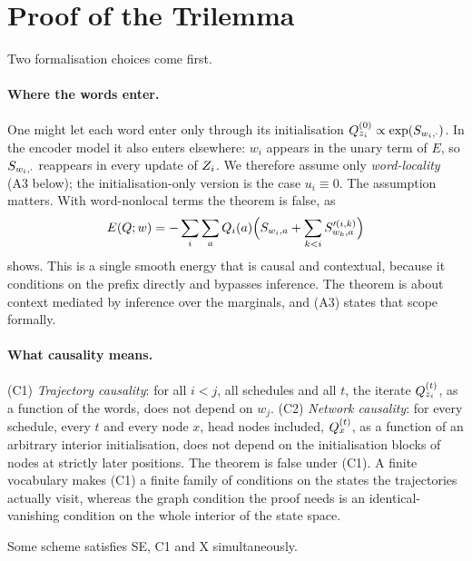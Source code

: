 \section{Proof of the Trilemma}
\label{app:proof}

Two formalisation choices come first.

\paragraph{Where the words enter.}
One might let each word enter only through its initialisation
$Q_{z_i}^{(0)} \propto \exp(S_{w_i,\cdot})$. In the encoder model it also enters elsewhere:
$w_i$ appears in the unary term of $E$, so $S_{w_i,\cdot}$ reappears in every update of
$Z_{i}$. We therefore assume only \emph{word-locality} (A3 below); the initialisation-only
version is the case $u_i \equiv 0$. The assumption matters. With word-nonlocal terms the theorem
is false, as
%
\begin{equation}
\label{eq:nonlocal-witness}
  E(Q; w) = -\sum_i \sum_a Q_i(a)\Big(S_{w_i,a}
     + \sum_{k<i} S'^{(i,k)}_{w_k,a}\Big)
\end{equation}
%
shows. This is a single smooth energy that is causal and contextual, because it conditions on
the prefix directly and bypasses inference. The theorem is about context mediated by inference
over the marginals, and (A3) states that scope formally.

\paragraph{What causality means.}
(C1) \emph{Trajectory causality}: for all $i<j$, all schedules and all $t$, the iterate
$Q_{z_i}^{(t)}$, as a function of the words, does not depend on $w_j$. (C2) \emph{Network
causality}: for every schedule, every $t$ and every node $x$, head nodes included,
$Q_x^{(t)}$, as a function of an arbitrary interior initialisation, does not depend on the
initialisation blocks of nodes at strictly later positions. The theorem is false under (C1). A
finite vocabulary makes (C1) a finite family of conditions on the states the trajectories
actually visit, whereas the graph condition the proof needs is an identical-vanishing condition
on the whole interior of the state space.

\begin{proposition}[Sharpness]
\label{app:prop-sharp}
Some scheme satisfies SE, C1 and X simultaneously.
\end{proposition}

